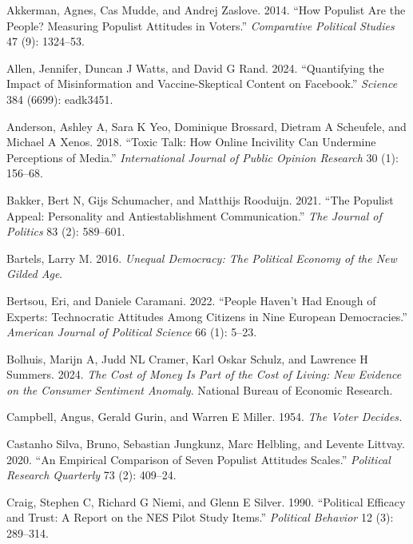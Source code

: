 \documentclass[
  12pt]{article}
\newlength{\cslhangindent}
\newenvironment{CSLReferences}[2] %
 {\begin{list}{}{%
  \setlength{\itemindent}{0pt}
  \setlength{\leftmargin}{0pt}
  \setlength{\parsep}{0pt}
  \ifodd #1
   \setlength{\leftmargin}{\cslhangindent}
   \setlength{\itemindent}{-1\cslhangindent}
  \fi
  \setlength{\itemsep}{#2\baselineskip}}}
 {\end{list}}
\begin{document}
\protect{}\label{refs}
\begin{CSLReferences}{1}{1}
Akkerman, Agnes, Cas Mudde, and Andrej Zaslove. 2014. {``How Populist
Are the People? Measuring Populist Attitudes in Voters.''}
\emph{Comparative Political Studies} 47 (9): 1324--53.

Allen, Jennifer, Duncan J Watts, and David G Rand. 2024. {``Quantifying
the Impact of Misinformation and Vaccine-Skeptical Content on
Facebook.''} \emph{Science} 384 (6699): eadk3451.

Anderson, Ashley A, Sara K Yeo, Dominique Brossard, Dietram A Scheufele,
and Michael A Xenos. 2018. {``Toxic Talk: How Online Incivility Can
Undermine Perceptions of Media.''} \emph{International Journal of Public
Opinion Research} 30 (1): 156--68.

Bakker, Bert N, Gijs Schumacher, and Matthijs Rooduijn. 2021. {``The
Populist Appeal: Personality and Antiestablishment Communication.''}
\emph{The Journal of Politics} 83 (2): 589--601.

Bartels, Larry M. 2016. \emph{Unequal Democracy: The Political Economy
of the New Gilded Age}.

Bertsou, Eri, and Daniele Caramani. 2022. {``People Haven't Had Enough
of Experts: Technocratic Attitudes Among Citizens in Nine European
Democracies.''} \emph{American Journal of Political Science} 66 (1):
5--23.

Bolhuis, Marijn A, Judd NL Cramer, Karl Oskar Schulz, and Lawrence H
Summers. 2024. \emph{The Cost of Money Is Part of the Cost of Living:
New Evidence on the Consumer Sentiment Anomaly}. National Bureau of
Economic Research.

Campbell, Angus, Gerald Gurin, and Warren E Miller. 1954. \emph{The
Voter Decides.}

Castanho Silva, Bruno, Sebastian Jungkunz, Marc Helbling, and Levente
Littvay. 2020. {``An Empirical Comparison of Seven Populist Attitudes
Scales.''} \emph{Political Research Quarterly} 73 (2): 409--24.

Craig, Stephen C, Richard G Niemi, and Glenn E Silver. 1990.
{``Political Efficacy and Trust: A Report on the NES Pilot Study
Items.''} \emph{Political Behavior} 12 (3): 289--314.


\end{CSLReferences}
\end{document}
